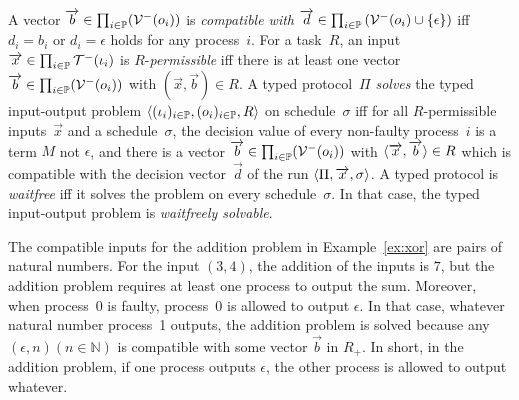 A vector $\overrightarrow b\in \prod_{i\in \mathbb{P}}(\mathcal{V}^-(o_i))$
is \textit{compatible with} $\overrightarrow d \in \prod_{i\in
\mathbb{P}}\left(\mathcal{V}^-(o_i)\cup\{\epsilon\}\right)$ iff
$d_i = b_i$ or $d_i = \epsilon$ holds for any process~$i$.
For a task~$R$,
an input~$\overrightarrow x\in \prod_{i\in \mathbb{P}}\mathcal{T}^-(\iota_i)$
is \linebreak[2] $R$-\textit{permissible} iff there
is at least one
vector $\overrightarrow b\in \prod_{i\in \mathbb{P}}(\mathcal{V}^-(o_i))$ with $(\vec x, \vec b)\in R$.
A typed protocol~$\Pi$ \textit{solves} the typed input-output problem
  $\langle{(\iota_i)_{i\in \mathbb{P}}, (o_i)_{i\in \mathbb{P}}, R}\rangle$ on
schedule~$\sigma$ iff for all $R$-permissible inputs~$\vec x$ and a
schedule~$\sigma$,
 the decision value of every non-faulty process~$i$ is a term
       $M$ not $\epsilon$, and
 there is a vector $\overrightarrow b\in \prod_{i\in \mathbb{P}}(\mathcal{V}^- (o_i))$
 with $\langle{\overrightarrow x, \overrightarrow b}\rangle \in R$ which is compatible with the
 decision vector~$\vec d$ of the run $\langle{\Pi,\overrightarrow x,\sigma}\rangle$.
 A typed protocol is \textit{waitfree} iff it solves
 the problem on every schedule~$\sigma$.
 In that case, the typed input-output problem is
 \textit{waitfreely solvable}.

 \begin{example}
  The compatible inputs for the addition problem in
  Example~\ref{ex:xor} are pairs of natural numbers.
  For the input $(3,4)$, the addition of the inputs is
  $7$,
  but the addition problem requires at least one process to output
  the sum.
  Moreover, when process~0 is faulty, process~0 is allowed to output
  $\epsilon$.
  In that case, whatever natural number process~1 outputs,
  the addition problem is solved because any $(\epsilon,n) (n\in
  \mathbb{N})$ is
  compatible with some vector $\vec b$ in $R_{+}$.
  In short, in the addition problem, if one process outputs
  $\epsilon$, the other process is allowed to output whatever.
 \end{example}

